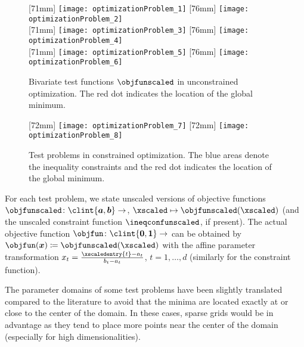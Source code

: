 \begin{figure}
  [71mm]{%
    \texttt{[image: optimizationProblem\_1]}%
  }%
  \hfill%
  [76mm]{%
    \texttt{[image: optimizationProblem\_2]}%
  }\\[2.5mm]%
  [71mm]{%
    \texttt{[image: optimizationProblem\_3]}%
  }%
  \hfill%
  [76mm]{%
    \texttt{[image: optimizationProblem\_4]}%
  }\\[2.5mm]%
  [71mm]{%
    \texttt{[image: optimizationProblem\_5]}%
  }%
  \hfill%
  [76mm]{%
    \texttt{[image: optimizationProblem\_6]}%
  }%
  \caption[%
    Unconstrained test problems%
  ]{%
    Bivariate test functions $\objfunscaled$ in unconstrained optimization.
    The \textcolor{C1}{red dot} indicates the location of the
    global minimum.%
  }%
  \label{fig:unconstrainedOptimizationProblem}%
\end{figure}

\begin{figure}
  [72mm]{%
    \texttt{[image: optimizationProblem\_7]}%
  }%
  \hfill%
  [72mm]{%
    \texttt{[image: optimizationProblem\_8]}%
  }%
  \caption[%
    Constrained test problems%
  ]{%
    Test problems in constrained optimization.
    The \textcolor{C0}{blue areas} denote the inequality constraints and
    the \textcolor{C1}{red dot} indicates the location of the
    global minimum.%
  }%
  \label{fig:constrainedOptimizationProblem}%
\end{figure}

For each test problem, we state unscaled versions of objective functions
$\objfunscaled\colon \clint{\*a, \*b} \to \real$,
$\xscaled \mapsto \objfunscaled(\xscaled)$
(and the unscaled constraint function $\ineqconfunscaled$, if present).
The actual objective function $\objfun\colon \clint{\*0, \*1} \to \real$
can be obtained by $\objfun(\*x) \ceq \objfunscaled(\xscaled)$
with the affine parameter transformation
$x_t = \tfrac{\xscaledentry{t} - a_t}{b_t - a_t}$, $t = 1, \dotsc, d$
(similarly for the constraint function).

\vspace*{1em}

The parameter domains of some test problems have been slightly translated
compared to the literature
to avoid that the minima are located exactly at or close to
the center of the domain.
In these cases, sparse grids would be in advantage as
they tend to place more points near the center of the domain
(especially for high dimensionalities).
